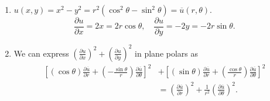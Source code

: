 \documentclass[12pt]{report}
\theoremstyle{definition}
\begin{document}
\begin{enumerate}[label = (\roman*)]
    \item $u(x,y) = x^{2}-y^{2} = r^{2}(\cos^{2}{\theta} - \sin^{2}{\theta}) = \overline{u}(r,\theta)$.\[
        \frac{\partial u}{\partial x} = 2x = 2r\cos{\theta}, \quad
        \frac{\partial u}{\partial y} = -2y = -2r\sin{\theta}.
    \]

\item We can express 
    ${\left(\frac{\partial u}{\partial x}\right)}^{2} + {\left(\frac{\partial u}{\partial y}\right)}^{2}$
    in plane polars as\[
        \begin{align*}
        {\left[(\cos{\theta})\frac{\partial \overline{u}}{\partial r} 
        + \left(-\frac{\sin{\theta}}{r}\right) \frac{\partial \overline{u}}{\partial \theta} \right]}^{2}
        & + {\left[(\sin{\theta})\frac{\partial \overline{u}}{\partial r} 
        + \left(\frac{\cos{\theta}}{r}\right) \frac{\partial \overline{u}}{\partial \theta} \right]}^{2} \\
        & = {\left(\frac{\partial \overline{u}}{\partial r} \right)}^{2}
        + \frac{1}{r^{2}} {\left(\frac{\partial \overline{u}}{\partial \theta} \right)}^{2}.
        \end{align*}
    \]


\end{enumerate}
\end{document}
